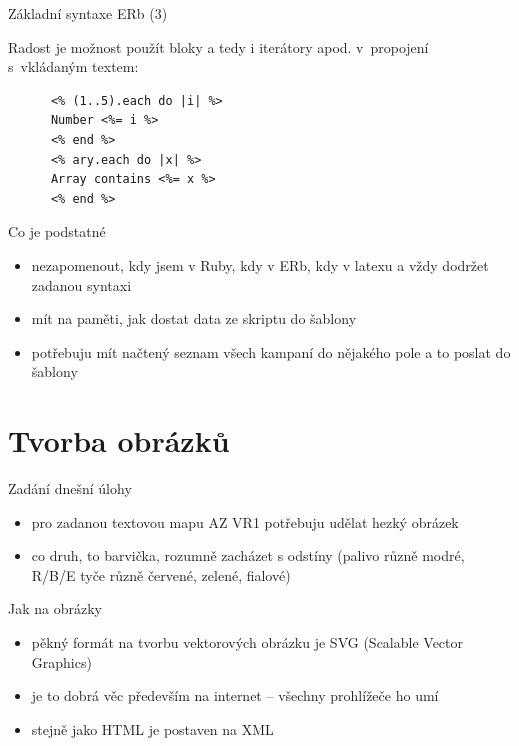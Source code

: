 \documentclass{beamer}
\begin{document}
\begin{frame}[fragile]{Základní syntaxe ERb (3)}
  \begin{block}{ }
    Radost je možnost použít bloky a tedy i iterátory apod. v~propojení s~vkládaným textem:
    \scriptsize
    \begin{verbatim}
      <% (1..5).each do |i| %>
      Number <%= i %>
      <% end %>
      <% ary.each do |x| %>
      Array contains <%= x %>
      <% end %>
    \end{verbatim}
  \end{block}
\end{frame}

\begin{frame}{Co je podstatné}
  \begin{itemize}
    \item nezapomenout, kdy jsem v Ruby, kdy v ERb, kdy v latexu a vždy dodržet zadanou syntaxi
    \item mít na paměti, jak dostat data ze skriptu do šablony
    \item potřebuju mít načtený seznam všech kampaní do nějakého pole a to poslat do šablony
  \end{itemize}
\end{frame}


\section{Tvorba obrázků}

\begin{frame}{Zadání dnešní úlohy}
  \begin{itemize}
    \item pro zadanou textovou mapu AZ VR1 potřebuju udělat hezký obrázek
    \item co druh, to barvička, rozumně zacházet s odstíny (palivo různě modré, R/B/E tyče různě červené, zelené, fialové)
  \end{itemize}
\end{frame}

\begin{frame}{Jak na obrázky}
  \begin{itemize}
    \item pěkný formát na tvorbu vektorových obrázku je SVG (Scalable Vector Graphics)
    \item je to dobrá věc především na internet -- všechny prohlížeče ho umí
    \item stejně jako HTML je postaven na XML
  \end{itemize}
\end{frame}
\end{document}

